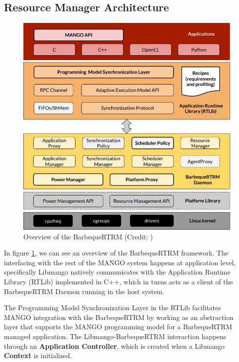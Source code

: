 \subsection{Resource Manager Architecture}

\begin{figure}[ht]
    \centering
    \includegraphics[width=\textwidth]{img/barbecue-arch.png}
    \captionsetup{justification=centering}
    \caption{Overview of the BarbequeRTRM (Credit: \cite{mango_exploring_manycore_architectures})}
    \label{fig:barbecue-arch}
\end{figure}

In figure \ref{fig:barbecue-arch}, we can see an overview of the BarbequeRTRM framework. The interfacing with the rest of the MANGO system happens at application level, specifically Libmango natively communicates with the Application Runtime Library (RTLib) implemented in C++, which in turns acts as a client of the BarbequeRTRM Daemon running in the host system.

The Programming Model Synchronization Layer in the RTLib facilitates MANGO integration with the BarbequeRTRM by working as an abstraction layer that supports the MANGO programming model for a BarbequeRTRM managed application.
The Libmango-BarbequeRTRM interaction happens through an \textbf{Application Controller}, which is created when a Libmango \textbf{Context} is initialized.

